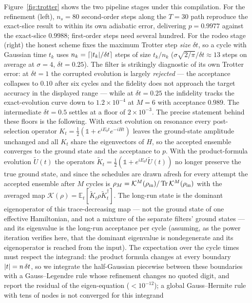 \documentclass[
  aps,            %
  prc,            %
  reprint,        %
  superscriptaddress,
  floatfix,
  nofootinbib
]{revtex4-2}
\begin{document}
Figure~\ref{fig:trotter} shows the two pipeline stages under this compilation.
For the refinement (left), $n_s=80$ second-order steps along the $T=30$ path
reproduce the exact-slice result to within its own adiabatic error, delivering
$p=0.9977$ against the exact-slice $0.9988$; first-order steps need several
hundred.  For the rodeo stage (right) the honest scheme fixes the maximum
Trotter step \emph{size} $\delta t$, so a cycle with Gaussian time $t_k$ uses
$n_k=\lceil \abs{t_k}/\delta t\rceil$ steps of size $t_k/n_k$
($\sigma\sqrt{2/\pi}/\delta t\approx13$ steps on average at $\sigma=4$,
$\delta t=0.25$).  The filter is strikingly diagnostic of its own Trotter
error: at $\delta t=1$ the corrupted evolution is largely \emph{rejected} ---
the acceptance collapses to $0.10$ after six cycles and the fidelity does not
approach the target accuracy in the displayed range --- while at
$\delta t=0.25$ the infidelity tracks the exact-evolution curve down to
$1.2\times10^{-4}$ at $M=6$ with acceptance $0.989$.  The intermediate
$\delta t=0.5$ settles at a floor of $2\times10^{-3}$.  The precise
statement behind these floors is the following.  With exact evolution on
resonance every post-selection operator $K_t=\tfrac12(\mathbb1+e^{iE_0t}e^{-iHt})$
leaves the ground-state amplitude unchanged and all $K_t$ share the
eigenvectors of $H$, so the accepted ensemble converges to the ground state
and the acceptance to $p$.  With the product-formula evolution $\tilde U(t)$
the operators $\tilde K_t=\tfrac12(\mathbb1+e^{iE_0t}\tilde U(t))$ no longer
preserve the true ground state, and since the schedules are drawn afresh
for every attempt the accepted ensemble after $M$ cycles is
$\rho_M=\mathcal K^M(\rho_{\rm in})/\Tr\mathcal K^M(\rho_{\rm in})$ with the
averaged map $\mathcal K(\rho)=\mathbb E_t[\tilde K_t\rho\tilde K_t^\dagger]$.
The long-run state is the dominant eigenoperator of this trace-decreasing map
--- not the ground state of one effective Hamiltonian, and not a mixture of
the separate filters' ground states --- and its eigenvalue is the long-run
acceptance per cycle (assuming, as the power iteration verifies here, that
the dominant eigenvalue is nondegenerate and its eigenoperator is reached
from the input).  The expectation over the cycle times must respect the
integrand: the product formula changes at every boundary $\abs{t}=n\,\delta
t$, so we integrate the half-Gaussian piecewise between these boundaries
with a Gauss--Legendre rule whose refinement changes no quoted digit, and
report the residual of the eigen-equation ($<10^{-12}$); a global
Gauss--Hermite rule with tens of nodes is not converged for this integrand
\end{document}
